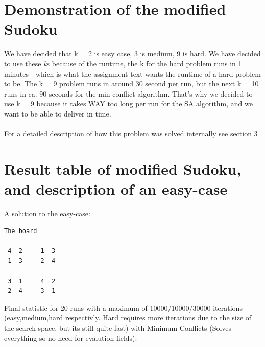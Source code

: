 \documentclass[12pt, a4paper]{article}
\begin{document}
\section{Demonstration of the modified Sudoku}
We have decided that k = 2 is easy case, 3 is medium, 9 is hard. 
We have decided to use these \textit{k}s because of the runtime, the k for the hard problem runs in 1 minutes - which is what the assignment text wants the runtime of a hard problem to be. The k = 9 problem runs in around 30 second per run, but the next k = 10 runs in ca. 90 seconds for the min conflict algorithm. That's why we decided to use k = 9 because it takes WAY too long per run for the SA algorithm, and we want to be able to deliver in time.
\\\\
For a detailed description of how this problem was solved internally see section 3

\section{Result table of modified Sudoku, and description of an easy-case}
A solution to the easy-case:
\begin{verbatim}
The board

 4  2     1  3 
 1  3     2  4 

 3  1     4  2 
 2  4     3  1 

\end{verbatim}

\noindent
Final statistic for 20 runs with a maximum of 10000/10000/30000 iterations (easy,medium,hard respectivly. Hard requires more iterations due to the size of the search space, but its still quite fast) with Minimum Conflicts (Solves everything so no need for evalution fields):
\end{document}
